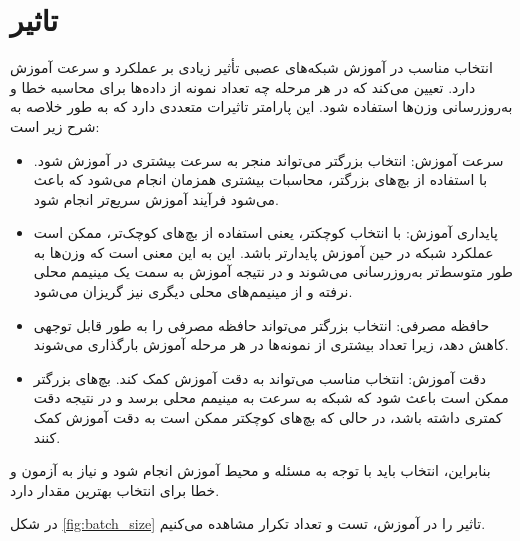 \documentclass[12pt, dvipsnames, svgnames, x11names,]{article}
\begin{document}
		
	\section{تاثیر }
	
		انتخاب مناسب  در آموزش شبکه‌های عصبی تأثیر زیادی بر عملکرد و سرعت آموزش دارد.  تعیین می‌کند که در هر مرحله چه تعداد نمونه از داده‌ها برای محاسبه خطا و به‌روزرسانی وزن‌ها استفاده شود. این پارامتر تاثیرات متعددی دارد که به طور خلاصه به شرح زیر است:
		
		\begin{itemize}
			
			\item سرعت آموزش:
			انتخاب  بزرگتر می‌تواند منجر به سرعت بیشتری در آموزش شود. با استفاده از بچ‌های بزرگتر، محاسبات بیشتری همزمان انجام می‌شود که باعث می‌شود فرآیند آموزش سریع‌تر انجام شود.
			
			\item پایداری آموزش:
			با انتخاب  کوچکتر، یعنی استفاده از بچ‌های کوچک‌تر، ممکن است عملکرد شبکه در حین آموزش پایدارتر باشد. این به این معنی است که وزن‌ها به طور متوسط‌تر به‌روزرسانی می‌شوند و در نتیجه آموزش به سمت یک مینیمم محلی نرفته و از مینیمم‌های محلی دیگری نیز گریزان می‌شود.
			
			\item حافظه مصرفی:
			انتخاب  بزرگتر می‌تواند حافظه مصرفی را به طور قابل توجهی کاهش دهد، زیرا تعداد بیشتری از نمونه‌ها در هر مرحله آموزش بارگذاری می‌شوند.
			
			\item دقت آموزش:
			انتخاب مناسب  می‌تواند به دقت آموزش کمک کند. بچ‌های بزرگتر ممکن است باعث شود که شبکه به سرعت به مینیمم محلی برسد و در نتیجه دقت کمتری داشته باشد، در حالی که بچ‌های کوچکتر ممکن است به دقت آموزش کمک کنند.
			
		\end{itemize}
		
		بنابراین، انتخاب  باید با توجه به مسئله و محیط آموزش انجام شود و نیاز به آزمون و خطا برای انتخاب بهترین مقدار دارد.
	
	در شکل \ref{fig:batch_size} تاثیر  را در آموزش،‌ تست و تعداد تکرار مشاهده می‌کنیم.
	
\end{document}
